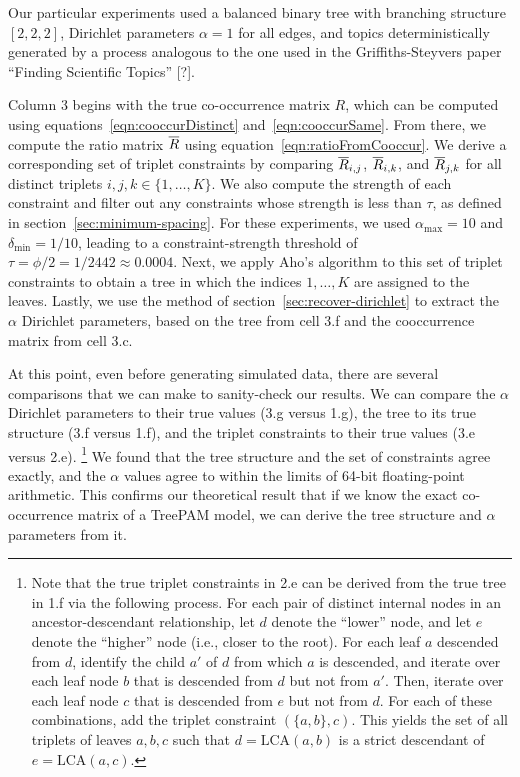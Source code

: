 \documentclass{article}
\theoremstyle{definition}
\newcommand{\deltaMin}{\delta_{\text{min}}}
\newcommand{\alphaMax}{\alpha_{\text{max}}}
\newcommand{\LCA}{\text{LCA}}
\newcommand{\tocite}{[?]}
\begin{document}
Our particular experiments used a balanced binary tree with branching structure $[2,2,2]$, Dirichlet parameters $\alpha = 1$ for all edges, and topics deterministically generated by a process analogous to the one used in the Griffiths-Steyvers paper ``Finding Scientific Topics'' \tocite{}.

Column 3 begins with the true co-occurrence matrix $R$, which can be computed using equations~\eqref{eqn:cooccurDistinct} and~\eqref{eqn:cooccurSame}.
From there, we compute the ratio matrix $\overline{R}$ using equation~\eqref{eqn:ratioFromCooccur}.
We derive a corresponding set of triplet constraints by comparing $\overline{R}_{i,j}$, $\overline{R}_{i,k}$, and $\overline{R}_{j,k}$ for all distinct triplets $i,j,k \in \{1, \ldots, K\}$.
We also compute the strength of each constraint and filter out any constraints whose strength is less than $\tau$, as defined in section~\ref{sec:minimum-spacing}.
For these experiments, we used $\alphaMax = 10$ and $\deltaMin = 1/10$, leading to a constraint-strength threshold of $\tau = \phi/2 = 1/2442 \approx 0.0004$.
Next, we apply Aho's algorithm to this set of triplet constraints to obtain a tree in which the indices $1, \ldots, K$ are assigned to the leaves.
Lastly, we use the method of section~\ref{sec:recover-dirichlet} to extract the $\alpha$ Dirichlet parameters, based on the tree from cell 3.f and the cooccurrence matrix from cell 3.c.

At this point, even before generating simulated data, there are several comparisons that we can make to sanity-check our results.
We can compare the $\alpha$ Dirichlet parameters to their true values (3.g versus 1.g), the tree to its true structure (3.f versus 1.f), and the triplet constraints to their true values (3.e versus 2.e).%
\footnote{%
Note that the true triplet constraints in 2.e can be derived from the true tree in 1.f via the following process.
For each pair of distinct internal nodes in an ancestor-descendant relationship, let $d$ denote the ``lower'' node, and let $e$ denote the ``higher'' node (i.e., closer to the root).
For each leaf $a$ descended from $d$, identify the child $a'$ of $d$ from which $a$ is descended, and iterate over each leaf node $b$ that is descended from $d$ but not from $a'$.
Then, iterate over each leaf node $c$ that is descended from $e$ but not from $d$.
For each of these combinations, add the triplet constraint $(\{a,b\}, c)$.
This yields the set of all triplets of leaves $a,b,c$ such that $d=\LCA(a,b)$ is a strict descendant of $e=\LCA(a,c)$.}
We found that the tree structure and the set of constraints agree exactly, and the $\alpha$ values agree to within the limits of 64-bit floating-point arithmetic.
This confirms our theoretical result that if we know the exact co-occurrence matrix of a TreePAM model, we can derive the tree structure and $\alpha$ parameters from it.
\end{document}
